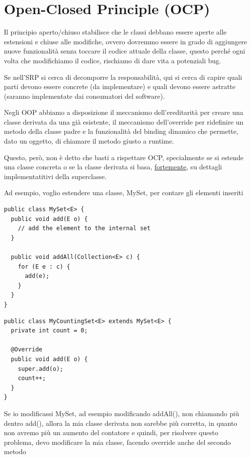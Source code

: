 \section{Open-Closed Principle (OCP)}

Il principio aperto/chiuso stabilisce che le classi debbano essere aperte alle estensioni e chiuse alle modifiche, ovvero dovremmo essere in grado di aggiungere nuove 
funzionalità senza toccare il codice attuale della classe, questo perché ogni volta che modifichiamo il codice, rischiamo di dare vita a potenziali bug.
\smallskip

Se nell'SRP si cerca di decomporre la responsabilità, qui si cerca di capire quali parti devono essere concrete (da implementare) e quali devono essere astratte 
(saranno implementate dai consumatori del software).
\smallskip

Negli OOP abbiamo a disposizione il meccanismo dell'ereditarità per creare una classe derivata da una già esistente, il meccanismo dell'override per ridefinire un metodo 
della classe padre e la funzionalità del binding dinamico che permette, dato un oggetto, di chiamare il metodo giusto a runtime.

Questo, però, non è detto che basti a rispettare OCP, specialmente se si estende una classe concreta o se la classe derivata si basa, \underline{fortemente}, su 
dettagli implementatitivi della superclasse.

Ad esempio, voglio estendere una classe, MySet, per contare gli elementi inseriti

\begin{multicols}{2}
\begin{lstlisting}
public class MySet<E> {
  public void add(E o) {
    // add the element to the internal set
  }

  public void addAll(Collection<E> c) {
    for (E e : c) {
      add(e);
    }
  }
}
\end{lstlisting}
\columnbreak
\begin{lstlisting}
public class MyCountingSet<E> extends MySet<E> {
  private int count = 0;
  
  @Override
  public void add(E o) {
    super.add(o);
    count++;
  }
} 
\end{lstlisting}
\end{multicols}

\newpage
Se io modificassi MySet, ad esempio modificando addAll(), non chiamando più dentro add(), allora la mia classe derivata non sarebbe più corretta, in quanto non avremo 
più un aumento del contatore e quindi, per risolvere questo problema, devo modificare la mia classe, facendo override anche del secondo metodo


